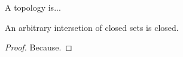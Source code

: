 \documentclass{article}
\begin{document}
  \begin{definition}
    A topology is...
  \end{definition}

  \begin{theorem}
    An arbitrary intersetion of closed sets is closed.
  \end{theorem}

  \begin{proof}
    Because.
  \end{proof}
\end{document}
